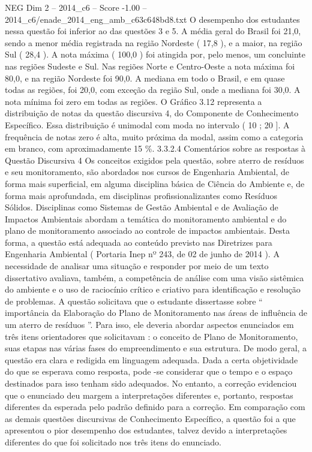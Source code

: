 \begin{textsample}{NEG Dim 2 – 2014\_c6 – Score -1.00 – 2014\_c6/enade\_2014\_eng\_amb\_c63c648bd8.txt}
O desempenho dos estudantes nessa questão foi inferior ao das questões 3 e 5.
A média geral do Brasil foi 21,0, sendo a menor média registrada na região Nordeste ( 17,8 ), e a maior, na região Sul ( 28,4 ).
A nota máxima ( 100,0 ) foi atingida por, pelo menos, um concluinte nas regiões Sudeste e Sul.
Nas regiões Norte e Centro-Oeste a nota máxima foi 80,0, e na região Nordeste foi 90,0.
A mediana em todo o Brasil, e em quase todas as regiões, foi 20,0, com exceção da região Sul, onde a mediana foi 30,0.
A nota mínima foi zero em todas as regiões.
O Gráfico 3.12 representa a distribuição de notas da questão discursiva 4, do Componente de Conhecimento Específico.
Essa distribuição é unimodal com moda no intervalo ( 10 ; 20 ].
A frequência de notas zero é alta, muito próxima da modal, assim como a categoria em branco, com aproximadamente 15 \%. 3.3.2.4 Comentários sobre as respostas à Questão Discursiva 4 Os conceitos exigidos pela questão, sobre aterro de resíduos e seu monitoramento, são abordados nos cursos de Engenharia Ambiental, de forma mais superficial, em alguma disciplina básica de Ciência do Ambiente e, de forma mais aprofundada, em disciplinas profissionalizantes como Resíduos Sólidos.
Disciplinas como Sistemas de Gestão Ambiental e de Avaliação de Impactos Ambientais abordam a temática do monitoramento ambiental e do plano de monitoramento associado ao controle de impactos ambientais.
Desta forma, a questão está adequada ao conteúdo previsto nas Diretrizes para Engenharia Ambiental ( Portaria Inep nº 243, de 02 de junho de 2014 ).
A necessidade de analisar uma situação e responder por meio de um texto dissertativo avaliava, também, a competência de análise com uma visão sistêmica do ambiente e o uso de raciocínio crítico e criativo para identificação e resolução de problemas.
A questão solicitava que o estudante dissertasse sobre “ importância da Elaboração do Plano de Monitoramento nas áreas de influência de um aterro de resíduos ”.
Para isso, ele deveria abordar aspectos enunciados em três itens orientadores que solicitavam : o conceito de Plano de Monitoramento, suas etapas nas várias fases do empreendimento e sua estrutura.
De modo geral, a questão era clara e redigida em linguagem adequada.
Dada a certa objetividade do que se esperava como resposta, pode -se considerar que o tempo e o espaço destinados para isso tenham sido adequados.
No entanto, a correção evidenciou que o enunciado deu margem a interpretações diferentes e, portanto, respostas diferentes da esperada pelo padrão definido para a correção.
Em comparação com as demais questões discursivas de Conhecimento Específico, a questão foi a que apresentou o pior desempenho dos estudantes, talvez devido a interpretações diferentes do que foi solicitado nos três itens do enunciado.

\end{textsample}
